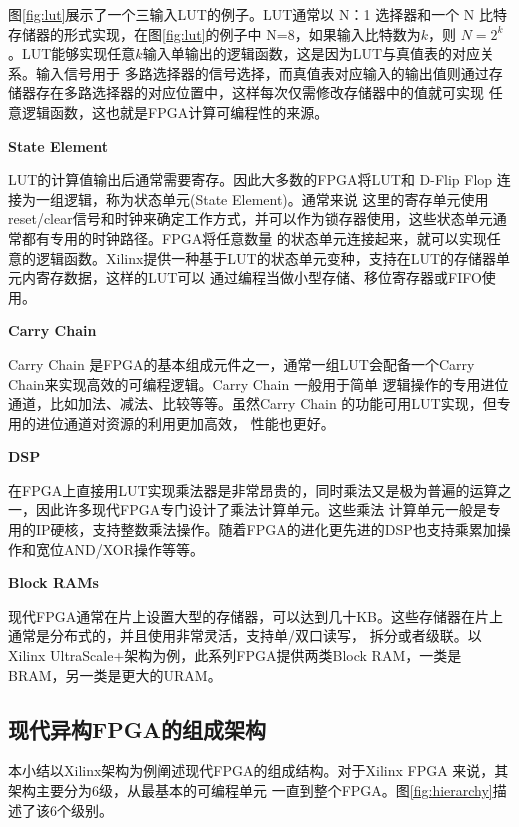 图\ref{fig:lut}展示了一个三输入LUT的例子。LUT通常以 N：1 选择器和一个 N 比特存储器的形式实现，在图\ref{fig:lut}的例子中
N=8，如果输入比特数为$k$，则 $N=2^k$。LUT能够实现任意$k$输入单输出的逻辑函数，这是因为LUT与真值表的对应关系。输入信号用于
多路选择器的信号选择，而真值表对应输入的输出值则通过存储器存在多路选择器的对应位置中，这样每次仅需修改存储器中的值就可实现
任意逻辑函数，这也就是FPGA计算可编程性的来源。

{\bf State Element}

LUT的计算值输出后通常需要寄存。因此大多数的FPGA将LUT和 D-Flip Flop 连接为一组逻辑，称为状态单元(State Element)。通常来说
这里的寄存单元使用reset/clear信号和时钟来确定工作方式，并可以作为锁存器使用，这些状态单元通常都有专用的时钟路径。FPGA将任意数量
的状态单元连接起来，就可以实现任意的逻辑函数。Xilinx提供一种基于LUT的状态单元变种，支持在LUT的存储器单元内寄存数据，这样的LUT可以
通过编程当做小型存储、移位寄存器或FIFO使用。

{\bf Carry Chain}

Carry Chain 是FPGA的基本组成元件之一，通常一组LUT会配备一个Carry Chain来实现高效的可编程逻辑。Carry Chain 一般用于简单
逻辑操作的专用进位通道，比如加法、减法、比较等等。虽然Carry Chain 的功能可用LUT实现，但专用的进位通道对资源的利用更加高效，
性能也更好。

{\bf DSP}

在FPGA上直接用LUT实现乘法器是非常昂贵的，同时乘法又是极为普遍的运算之一，因此许多现代FPGA专门设计了乘法计算单元。这些乘法
计算单元一般是专用的IP硬核，支持整数乘法操作。随着FPGA的进化更先进的DSP也支持乘累加操作和宽位AND/XOR操作等等。

{\bf Block RAMs}

现代FPGA通常在片上设置大型的存储器，可以达到几十KB。这些存储器在片上通常是分布式的，并且使用非常灵活，支持单/双口读写，
拆分或者级联。以Xilinx UltraScale+架构为例，此系列FPGA提供两类Block RAM，一类是BRAM，另一类是更大的URAM。



\subsection{现代异构FPGA的组成架构}

本小结以Xilinx架构为例阐述现代FPGA的组成结构。对于Xilinx FPGA 来说，其架构主要分为6级，从最基本的可编程单元
一直到整个FPGA。图\ref{fig:hierarchy}描述了该6个级别。

